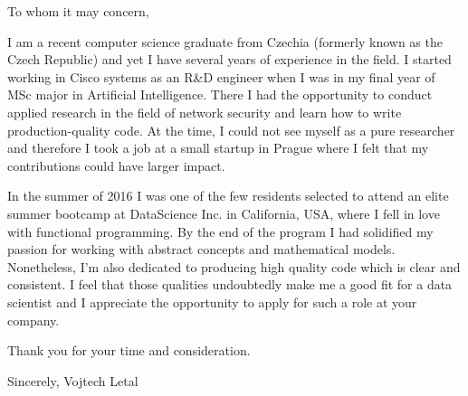 \documentclass[12pt]{article}
\begin{document}
To whom it may concern,

I am a recent computer science graduate from Czechia (formerly known as the Czech Republic) and yet I have several years of experience in the field. I started working in Cisco systems as an R\&D engineer when I was in my final year of MSc major in Artificial Intelligence. There I had the opportunity to conduct applied research in the field of network security and learn how to write production-quality code. At the time, I could not see myself as a pure researcher and therefore I took a job at a small startup in Prague where I felt that my contributions could have larger impact.

In the summer of 2016 I was one of the few residents selected to attend an elite summer bootcamp at DataScience Inc. in California, USA, where I fell in love with functional programming. By the end of the program I had solidified my passion for working with abstract concepts and mathematical models. Nonetheless, I’m also dedicated to producing high quality code which is clear and consistent. I feel that those qualities undoubtedly make me a good fit for a data scientist and I appreciate the opportunity to apply for such a role at your company.

Thank you for your time and consideration.

Sincerely,
Vojtech Letal
\end{document}
